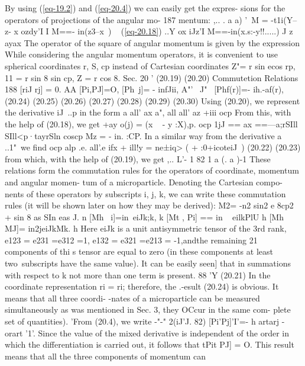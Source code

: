 \documentclass[a4paper,sfsidenotes,colorlinks=true]{tufte-book}
\numberwithin{equation}{section}
\numberwithin{figure}{section}
\begin{document}
By using (\ref{eq-19.2})
and (\ref{eq-20.4}) we can easily get the expres- sions for the operators of
projections of the angular mo-  187 mentum: ,.. . a a)
'\ M = -t1i(Y--z- x ozdy'I I M==- in(z3--x~) ~ (\ref{eq-20.18}) ..Y ox iJz'I
M==-in(x.s:-y!!.....) J z ayax The operator of the square of angular
momentum is given by the expression While considering the angular
momentum operators, it is convenient to use spherical coordinates r,
S, cp instead of Cartesian coordinates %
Z"= r sin ecos rp, 11 = r sin 8 sin cp, Z = r cos 8.  Sec. 20 '
(20.19) (20.20) Commutetion Relations 188 [riJ rj] = 0. AA [Pi,PJ]=O,
[Ph~j]= - infJii, A"'~ {J"~ [Phf(r)]=- ih.-af(r), (20.24) (20.25)
  (20.26) (20.27) (20.28) (20.29) (20.30) Using (20.20), we represent
  the derivative iJ~..p in the form a all' ax a", all all' az +iii ocp
  From this, with the help of (20.18), we get +ay o(j) = (x ~ - y
  :X),p.  ocp 1jJ == ax ==---a;rSIll SIll<p·tayrSln coscp Mz = -
  in. :CP. In a similar way from the derivative a ..1"\ we find ocp
  alp .e. all'.e ifx + ill!y = ne±iq> ( + :0+icoteiJ~) (20.22) (20.23)
  from which, with the help of (20.19), we get ,.. L'- 1 82 1 a (. a
  )-1 These relations form the commutation rules for the operators of
  coordinate, momentum and angular momen- tum of a
  microparticle. Denoting the Cartesian compo- nents of these
  operators by subscripts i, j, k, we can write these commutation
  rules (it will be shown later on how they may be derived): M2= -n2
  sin2 e 8cp2 + sin 8 as SIn eas J.  n [Mh ~i]=in~eiJk;k, k [Mt , Pi]
  == in ~ eilkPlU h [Mh MJ]= in2jeiJkMk. h Here eiJk is a unit
  antisymmetric tensor of the 3rd rank, e123 = e231 =e312 =1, e132 =
  e321 =e213 = -1,andthe remaining 21 components of thi s tensor are
  equal to zero (in these components at least two~subscripts have the
  same value). It can be easily seen] that in summations with respect
  to k not more than one term is present.  88 'Y (20.21) In the
  coordinate representation ri = ri; therefore, the .-esult (20.24) is
  obvious. It means that all three coordi- -nates of a microparticle
  can be measured simultaneously as was mentioned in Sec. 3, they
  OCcur in the same com- plete set of quantities). 'From (20.4), we
  write -"-" 2(iJ'J. 82) [Pi'Pj]'I'=- h artarj - orart '1'.  Since the
  value of the mixed derivative is independent of the order in which
  the differentiation is carried out, it follows that tPit PJ] =
  O. This result means that all the three components of momentum can
}
\end{document}
